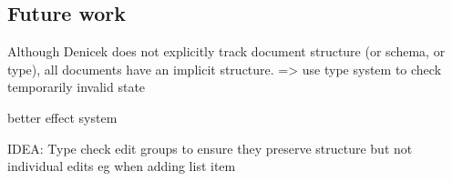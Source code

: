 \documentclass[sigconf,anonymous,screen]{acmart}
\begin{document}

\subsection{Future work}
\label{sec:discuss-future}
Although Denicek does not explicitly track document structure (or schema, or type), all documents
have an implicit structure.
=> use type system to check temporarily invalid state

better effect system

IDEA: Type check edit groups to ensure they preserve structure but not individual edits eg when adding list item

~

~
\end{document}

